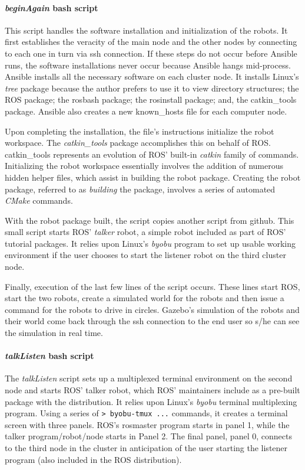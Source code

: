 \documentclass[9pt,twocolumn,twoside]{../../styles/osajnl}
\begin{document}
\paragraph{\textit{beginAgain} bash script}
This script handles the software installation and initialization of the robots.  It first establishes the veracity of the main node and the other nodes by connecting to each one in turn via ssh connection.  If these steps do not occur before Ansible runs, the software installations never occur because Ansible hangs mid-process.  Ansible installs all the necessary software on each cluster node.  It installs Linux's \textit{tree} package because the author prefers to use it to view directory structures; the ROS package; the rosbash package; the rosinstall package; and, the catkin\_tools package. Ansible also creates a new known\_hosts file for each computer node.

Upon completing the installation, the file's instructions initialize the robot workspace.  The \textit{catkin\_tools} package accomplishes this on behalf of ROS.  catkin\_tools represents an evolution of ROS' built-in \textit{catkin} family of commands.  Initializing the robot workspace essentially involves the addition of numerous hidden helper files, which assist in building the robot package.  Creating the robot package, referred to as \textit{building} the package, involves a series of automated \textit{CMake} commands.  

With the robot package built, the script copies another script from github.  This small script starts ROS' \textit{talker} robot, a simple robot included as part of ROS' tutorial packages.  It relies upon Linux's \textit{byobu} program to set up usable working environment if the user chooses to start the listener robot on the third cluster node.

Finally, execution of the last few lines of the script occurs.  These lines start ROS, start the two robots, create a simulated world for the robots and then issue a command for the robots to drive in circles.  Gazebo's simulation of the robots and their world come back through the ssh connection to the end user so s/he can see the simulation in real time. 

\paragraph{\textit{talkListen} bash script}
The \textit{talkListen} script sets up a multiplexed terminal environment on the second node and starts ROS' talker robot, which ROS' maintainers include as a pre-built package with the distribution.  It relies upon Linux's \textit{byobu} terminal multiplexing program.  Using a series of {\color{green} \lstinline[style=BashInputStyle]!> byobu-tmux ...! } commands, it creates a terminal screen with three panels.  ROS's rosmaster program starts in panel 1, while the talker program/robot/node starts in Panel 2.  The final panel, panel 0, connects to the third node in the cluster in anticipation of the user starting the listener program (also included in the ROS distribution).
\end{document}
